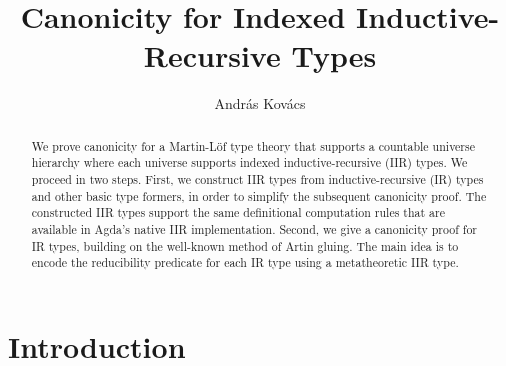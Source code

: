 \documentclass[acmsmall,screen,review,anonymous]{acmart}
\begin{document}
\title{Canonicity for Indexed Inductive-Recursive Types}

\author{András Kovács}


\begin{abstract}
We prove canonicity for a Martin-Löf type theory that supports a countable universe hierarchy where
each universe supports indexed inductive-recursive (IIR) types. We proceed in two steps. First, we
construct IIR types from inductive-recursive (IR) types and other basic type formers, in order to
simplify the subsequent canonicity proof. The constructed IIR types support the same definitional
computation rules that are available in Agda's native IIR implementation. Second, we give a
canonicity proof for IR types, building on the well-known method of Artin gluing. The main idea is
to encode the reducibility predicate for each IR type using a metatheoretic IIR type.
\end{abstract}


\maketitle

\section{Introduction}\label{sec:introduction}
\end{document}
